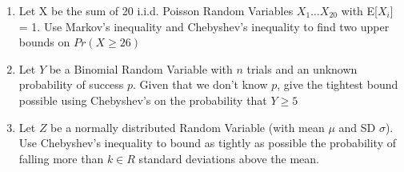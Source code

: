 
\begin{enumerate}
\item Let X be the sum of 20 i.i.d. Poisson Random Variables $X_1 \dotsc X_{20}$ with E[$X_i$] = 1. Use Markov's inequality and Chebyshev's inequality to find two upper bounds on $Pr(X \geq 26)$


\vspace{6cm}

\item Let $Y$ be a Binomial Random Variable with $n$ trials and an unknown probability of success $p$. Given that we don’t know $p$, give the tightest bound possible using Chebyshev's on the probability that $Y \geq 5$


\vspace{6cm}

\item Let $Z$ be a normally distributed Random Variable (with mean $\mu$ and SD $\sigma$). Use Chebyshev's inequality to bound as tightly as possible the probability of falling more than $k \in R$ standard deviations above the mean. 



\end{enumerate}